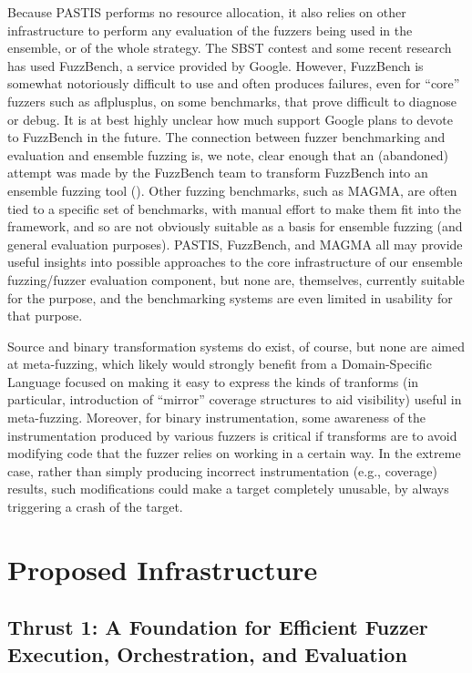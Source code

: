 \documentclass[numbers]{proposalnsf}
\begin{document}
Because PASTIS performs no resource allocation, it also relies on other infrastructure to perform any evaluation of the fuzzers being used in the ensemble, or of the whole strategy.  The SBST contest and some recent research has used FuzzBench, a service provided by Google.  However, FuzzBench is somewhat notoriously difficult to use and often produces failures, even for ``core'' fuzzers such as aflplusplus, on some benchmarks, that prove difficult to diagnose or debug.  It is at best highly unclear how much support Google plans to devote to FuzzBench in the future.  The connection between fuzzer benchmarking and evaluation and ensemble fuzzing is, we note, clear enough that an (abandoned) attempt was made by the FuzzBench team to transform FuzzBench into an ensemble fuzzing tool (\url{}).   Other fuzzing benchmarks, such as MAGMA, are often tied to a specific set of benchmarks, with manual effort to make them fit into the framework, and so are not obviously suitable as a basis for ensemble fuzzing (and general evaluation purposes).  PASTIS, FuzzBench, and MAGMA all may provide useful insights into possible approaches to the core infrastructure of our ensemble fuzzing/fuzzer evaluation component, but none are, themselves, currently suitable for the purpose, and the benchmarking systems are even limited in usability for that purpose.

Source and binary transformation systems do exist, of course, but none are aimed at meta-fuzzing, which likely would strongly benefit from a Domain-Specific Language focused on making it easy to express the kinds of tranforms (in particular, introduction of ``mirror'' coverage structures to aid visibility) useful in meta-fuzzing.  Moreover, for binary instrumentation, some awareness of the instrumentation produced by various fuzzers is critical if transforms are to avoid modifying code that the fuzzer relies on working in a certain way.  In the extreme case, rather than simply producing incorrect instrumentation (e.g., coverage) results, such modifications could make a target completely unusable, by always triggering a crash of the target.

\section{Proposed Infrastructure}

\subsection{Thrust 1: A Foundation for Efficient Fuzzer Execution, Orchestration, and Evaluation}
\end{document}
